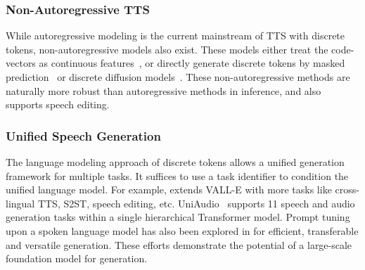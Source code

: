 \subsubsection{Non-Autoregressive TTS}
While autoregressive modeling is the current mainstream of TTS with discrete tokens, non-autoregressive models also exist.
These models either treat the code-vectors as continuous features~\cite{shen2024naturalspeech2}, or directly generate discrete tokens by masked prediction~\cite{wang2024maskgct} or discrete diffusion models~\cite{du2024unicats,facodec}.
These non-autoregressive methods are naturally more robust than autoregressive methods in inference, and also supports speech editing.

\subsubsection{Unified Speech Generation}
The language modeling approach of discrete tokens allows a unified generation framework for multiple tasks.
It suffices to use a task identifier to condition the unified language model.
For example, \cite{vallex,wang2024speechx} extends VALL-E with more tasks like cross-lingual TTS, S2ST, speech editing, etc.
UniAudio~\cite{yang2024uniaudio} supports 11 speech and audio generation tasks within a single hierarchical Transformer model.
Prompt tuning upon a spoken language model has also been explored in \cite{wu2023speechgen} for efficient, transferable and versatile generation.
These efforts demonstrate the potential of a large-scale foundation model for generation.

